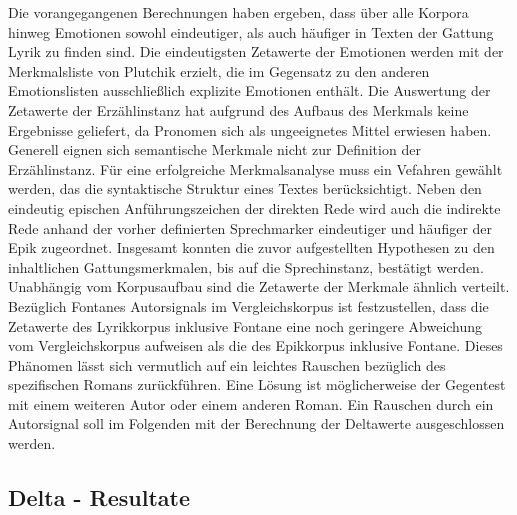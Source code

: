\documentclass[a4paper,10p]{article}
\begin{document}
Die vorangegangenen Berechnungen haben ergeben, dass über alle Korpora hinweg Emotionen sowohl eindeutiger, als auch häufiger in Texten der Gattung Lyrik zu finden sind. Die eindeutigsten Zetawerte der Emotionen werden mit der Merkmalsliste von Plutchik erzielt, die im Gegensatz zu den anderen Emotionslisten ausschließlich explizite Emotionen enthält. Die Auswertung der Zetawerte der Erzählinstanz hat aufgrund des Aufbaus des Merkmals keine Ergebnisse geliefert, da Pronomen sich als ungeeignetes Mittel erwiesen haben. Generell eignen sich semantische Merkmale nicht zur Definition der Erzählinstanz. Für eine erfolgreiche Merkmalsanalyse muss ein Vefahren gewählt werden, das die syntaktische Struktur eines Textes berücksichtigt. Neben den eindeutig epischen Anführungszeichen der direkten Rede wird auch die indirekte Rede anhand der vorher definierten Sprechmarker eindeutiger und häufiger der Epik zugeordnet. Insgesamt konnten die zuvor aufgestellten Hypothesen zu den inhaltlichen Gattungsmerkmalen, bis auf die Sprechinstanz, bestätigt werden. Unabhängig vom Korpusaufbau sind die Zetawerte der Merkmale ähnlich verteilt. Bezüglich Fontanes Autorsignals im Vergleichskorpus ist festzustellen, dass die Zetawerte des Lyrikkorpus inklusive Fontane eine noch geringere Abweichung vom Vergleichskorpus aufweisen als die des Epikkorpus inklusive Fontane. Dieses Phänomen lässt sich vermutlich auf ein leichtes Rauschen bezüglich des spezifischen Romans zurückführen. Eine Lösung ist möglicherweise der Gegentest mit einem weiteren Autor oder einem anderen Roman. Ein Rauschen durch ein Autorsignal soll im Folgenden mit der Berechnung der Deltawerte ausgeschlossen werden.


\subsection{Delta - Resultate}
\end{document}
